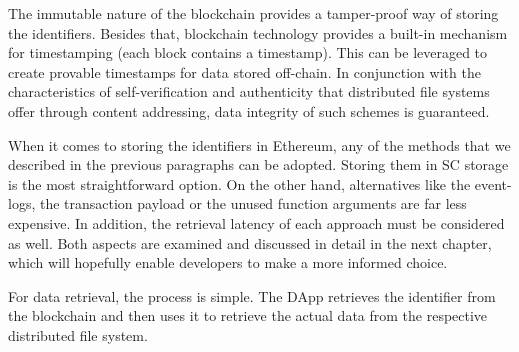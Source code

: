 The immutable nature of the blockchain provides a tamper-proof way of storing the identifiers. Besides that, blockchain technology provides a built-in mechanism for timestamping (each block contains a timestamp). This can be leveraged to create provable timestamps for data stored off-chain. In conjunction with the characteristics of self-verification and authenticity that distributed file systems offer through content addressing, data integrity of such schemes is guaranteed.

When it comes to storing the identifiers in Ethereum, any of the methods that we described in the previous paragraphs can be adopted. Storing them in SC storage is the most straightforward option. On the other hand, alternatives like the event-logs, the transaction payload or the unused function arguments are far less expensive. In addition, the retrieval latency of each approach must be considered as well. Both aspects are examined and discussed in detail in the next chapter, which will hopefully enable developers to make a more informed choice.

For data retrieval, the process is simple. The DApp retrieves the identifier from the blockchain and then uses it to retrieve the actual data from the respective distributed file system.
